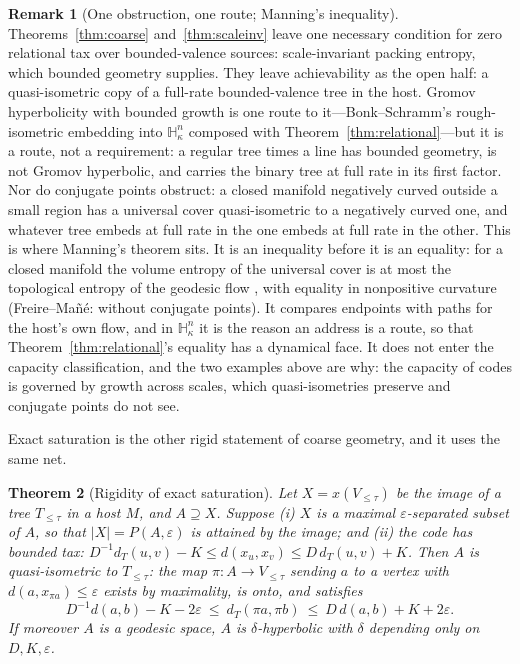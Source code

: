 \documentclass[11pt,reqno]{amsart}
\theoremstyle{plain}
\newtheorem{theorem}{Theorem}[section]
\theoremstyle{definition}
\newtheorem{remark}[theorem]{Remark}
\newcommand{\Hk}{\mathbb{H}^n_\kappa}
\newcommand{\eps}{\varepsilon}
\begin{document}
\begin{remark}[One obstruction, one route; Manning's inequality]\label{rem:twogaps}
Theorems~\ref{thm:coarse} and~\ref{thm:scaleinv} leave one necessary condition for zero relational tax over bounded-valence sources: scale-invariant packing entropy, which bounded geometry supplies. They leave achievability as the open half: a quasi-isometric copy of a full-rate bounded-valence tree in the host. Gromov hyperbolicity with bounded growth is one route to it---Bonk--Schramm's rough-isometric embedding into $\Hk$ \cite{bonkschramm2000} composed with Theorem~\ref{thm:relational}---but it is a route, not a requirement: a regular tree times a line has bounded geometry, is not Gromov hyperbolic, and carries the binary tree at full rate in its first factor. Nor do conjugate points obstruct: a closed manifold negatively curved outside a small region has a universal cover quasi-isometric to a negatively curved one, and whatever tree embeds at full rate in the one embeds at full rate in the other. This is where Manning's theorem sits. It is an inequality before it is an equality: for a closed manifold the volume entropy of the universal cover is at most the topological entropy of the geodesic flow \cite{manning1979}, with equality in nonpositive curvature (Freire--Mañé: without conjugate points). It compares endpoints with paths for the host's own flow, and in $\Hk$ it is the reason an address is a route, so that Theorem~\ref{thm:relational}'s equality has a dynamical face. It does not enter the capacity classification, and the two examples above are why: the capacity of codes is governed by growth across scales, which quasi-isometries preserve and conjugate points do not see.
\end{remark}


Exact saturation is the other rigid statement of coarse geometry, and it uses the same net.

\begin{theorem}[Rigidity of exact saturation]\label{thm:rigid}
Let $X=x(V_{\le\tau})$ be the image of a tree $T_{\le\tau}$ in a host $M$, and $A\supseteq X$. Suppose (i) $X$ is a maximal $\eps$-separated subset of $A$, so that $|X|=P(A,\eps)$ is attained by the image; and (ii) the code has bounded tax: $D^{-1}d_T(u,v)-K\le d(x_u,x_v)\le D\,d_T(u,v)+K$. Then $A$ is quasi-isometric to $T_{\le\tau}$: the map $\pi:A\to V_{\le\tau}$ sending $a$ to a vertex with $d(a,x_{\pi a})\le\eps$ exists by maximality, is onto, and satisfies
\[
D^{-1}d(a,b)-K-2\eps\ \le\ d_T(\pi a,\pi b)\ \le\ D\,d(a,b)+K+2\eps .
\]
If moreover $A$ is a geodesic space, $A$ is $\delta$-hyperbolic with $\delta$ depending only on $D,K,\eps$.
\end{theorem}
\end{document}
